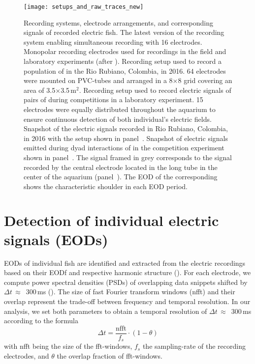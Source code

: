 \begin{figure}[h!]
  \centerline{\texttt{[image: setups\_and\_raw\_traces\_new]}}
  \caption{\label{setup_n_trace} Recording systems, electrode arrangements, and corresponding signals of recorded electric fish.  The latest version of the recording system enabling simultaneous recording with 16 electrodes.  Monopolar recording electrodes used for recordings in the field and laboratory experiments (after \citealp{Henninger2015}).  Recording setup used to record a population of \lepto{} in the Rio Rubiano, Colombia, in 2016. 64 electrodes were mounted on PVC-tubes and arranged in a 8$\times$8 grid covering an area of 3.5$\times$3.5\,m$^2$.  Recording setup used to record electric signals of pairs of \lepto{} during competitions in a laboratory experiment. 15 electrodes were equally distributed throughout the aquarium to ensure continuous detection of both individual's electric fields.  Snapshot of the electric signals recorded in Rio Rubiano, Colombia, in 2016 with the setup shown in panel~.  Snapshot of electric signals emitted during dyad interactions of \lepto{} in the competition experiment shown in panel~. The signal framed in grey corresponds to the signal recorded by the central electrode located in the long tube in the center of the aquarium (panel~). The EOD of the corresponding \lepto{} shows the characteristic shoulder in each EOD period.}
\end{figure}

%

\section{Detection of individual electric signals (EODs)}

EODs of individual fish are identified and extracted from the electric recordings based on their EODf and respective harmonic structure (). For each electrode, we compute power spectral densities (PSDs) of overlapping data snippets shifted by $\Delta t$\,$\approx$\, 300\,ms (). The size of fast Fourier transform windows (nfft) and their overlap represent the trade-off between frequency and temporal resolution. In our analysis, we set both parameters to obtain a temporal resolution of $\Delta t$\,$\approx$\, 300\,ms according to the formula
\begin{equation}
\Delta t = \frac{\text{nfft}}{f_s} \cdot (1-\theta) 
\end{equation}
with nfft being the size of the fft-windows, $f_s$ the sampling-rate of the recording electrodes, and $\theta$ the overlap fraction of fft-windows. 

